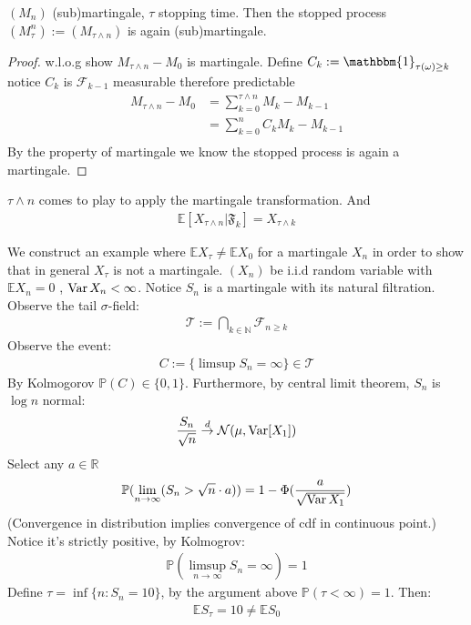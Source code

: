 \begin{theorem}
	$(M_n)$ (sub)martingale, $\tau$ stopping time. Then the stopped process $(M_\tau^n) := (M_{\tau \wedge n})$ is again (sub)martingale.
\end{theorem}
\begin{proof}
	w.l.o.g show $M_{\tau \wedge n} - M_0$ is martingale. Define $C_k:=\mathbbm{1}_{\tau(\omega) \geq k}$ notice $C_k$ is $\mathcal{F}_{k-1}$ measurable therefore predictable
	\begin{align*}
		M_{\tau \wedge n} - M_0 &= \sum_{k = 0}^{\tau \wedge n} M_k  - M_{k-1}\\
		&= \sum_{k = 0}^{n} C_k M_k - M_{k-1}\\
	\end{align*}
	By the property of martingale we know the stopped process is again a martingale.
\end{proof}
\begin{remark}
$\tau \wedge n$ comes to play to apply the martingale transformation. And 
\begin{align*}
	\mathbb{E}[X_{\tau \wedge n}|\mathfrak{F}_k] = X_{\tau \wedge k}
\end{align*}
\end{remark}

\begin{example}
We construct an example where $\mathbb{E} X_\tau \neq \mathbb{E} X_0$ for a martingale $X_n$ in order to show that in general $X_\tau$ is not a martingale.
$(X_n)$ be i.i.d  random variable with $\mathbb{E}X_n = 0$ , $\operatorname{Var} X_n < \infty$. Notice $S_n$ is a martingale with its natural filtration. Observe the tail $\sigma$-field:
\begin{align*}
	\mathcal{T}:= \bigcap_{k \in \mathbb{N}} \mathcal{F}_{n \geq k}
\end{align*}	
Observe the event:
\begin{align*}
	C:= \{ \limsup S_n = \infty \} \in \mathcal{T}
\end{align*}
By Kolmogorov $\mathbb{P}(C) \in \{0, 1\}$. Furthermore, by central limit theorem, $S_n$ is $\log n$ normal:
\begin{align*}
	\frac{S_n}{\sqrt{n}} \overset{d}{\rightarrow} \mathcal{N}(\mu, \operatorname{Var}[X_1])
\end{align*}
Select any $a \in \mathbb{R}$
\begin{align*}
	\mathbb{P}( \lim_{n \rightarrow \infty}( S_n > \sqrt{n} \cdot a))   = 1 - \Phi(\frac{a}{\sqrt{\operatorname{Var} X_1}})
\end{align*}
(Convergence in distribution implies convergence of cdf in continuous point.) Notice it's strictly positive, by Kolmogrov:
\begin{align*}
	\mathbb{P}(\limsup_{n \rightarrow \infty} S_n = \infty) = 1
\end{align*}
Define $\tau = \inf \{n: S_n = 10\}$, by the argument above $\mathbb{P}(\tau < \infty) = 1$. Then:
\begin{align*}
	\mathbb{E}S_\tau = 10 \neq \mathbb{E}S_0
\end{align*}
\end{example}

